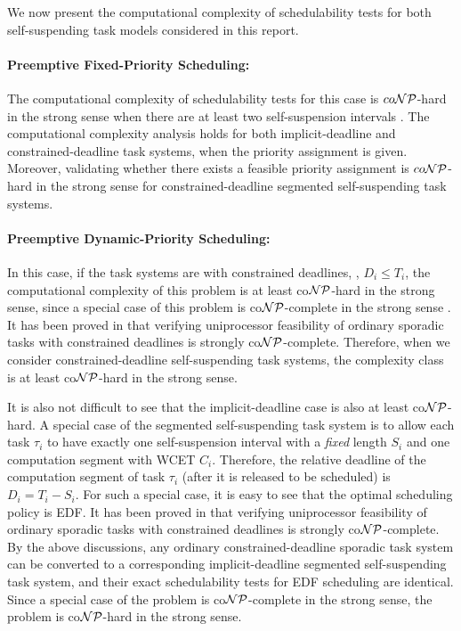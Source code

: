 
We now present the computational complexity of schedulability tests for both self-suspending task models considered in this report.


\paragraph{Preemptive Fixed-Priority Scheduling:}   
The computational complexity of schedulability tests for this case is $co{\cal NP}$-hard in the strong sense when there are at least two self-suspension intervals \cite{RTSS2016-suspension,DBLP:conf/rtns/MohaqeqiE016}. The computational complexity analysis holds for both implicit-deadline and constrained-deadline task systems, when the priority assignment is given.  Moreover, validating whether there exists a feasible priority assignment is $co{\cal NP}$-hard in the strong sense for constrained-deadline segmented self-suspending task systems.

\paragraph{Preemptive Dynamic-Priority Scheduling:} 
In this case, if the task systems are with constrained deadlines, \ie, $D_i \leq T_i$, the computational complexity of this problem is at least co${\cal NP}$-hard in the strong sense, since a special case of this problem is co${\cal NP}$-complete in the strong sense \cite{DBLP:conf/ecrts/Ekberg015}. It has been proved in \cite{DBLP:conf/ecrts/Ekberg015} that verifying uniprocessor feasibility of ordinary sporadic tasks with constrained deadlines is strongly co${\cal NP}$-complete.  Therefore, when we consider constrained-deadline self-suspending task systems, the complexity class is at least co${\cal NP}$-hard in the strong sense.

It is also not difficult to see that the implicit-deadline case is also at least co${\cal NP}$-hard.  A special case of the segmented self-suspending task system is to allow each task $\tau_i$ to have exactly one self-suspension interval with a \emph{fixed} length $S_i$ and one computation segment with WCET $C_i$.  Therefore, the relative deadline of the computation segment of task $\tau_i$ (after it is released to be scheduled) is $D_i = T_i-S_i$. For such a special case, it is easy to see that the optimal scheduling policy is EDF. 
It has been proved in \cite{DBLP:conf/ecrts/Ekberg015} that verifying uniprocessor feasibility of ordinary sporadic tasks with constrained deadlines is strongly co${\cal NP}$-complete.
By the above discussions, any ordinary constrained-deadline sporadic task system can be converted to a corresponding implicit-deadline segmented self-suspending task system, and their exact schedulability tests for EDF scheduling are identical. Since a special case of the problem is co${\cal NP}$-complete in the strong sense, the problem is co${\cal NP}$-hard in the strong sense.


